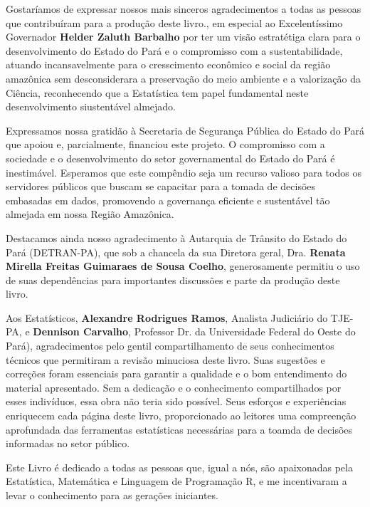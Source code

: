 \begin{refsection}


Gostaríamos de expressar nossos mais sinceros agradecimentos a todas as pessoas que contribuíram para a produção deste livro., em especial ao Excelentíssimo Governador \textbf{Helder Zaluth Barbalho} por ter um visão estratétiga clara para o desenvolvimento do Estado do Pará e o compromisso com a sustentabilidade, atuando incansavelmente para o cresscimento econômico e social da região amazônica sem desconsiderara a preservação do meio ambiente e a valorização da Ciência, reconhecendo que a Estatística tem papel fundamental neste desenvolvimento siustentável almejado.\vst

Expressamos nossa gratidão à Secretaria de Segurança Pública do Estado do Pará que apoiou e, parcialmente, financiou este projeto. O compromisso com a sociedade e o desenvolvimento do setor governamental do Estado do Pará é inestimável. Esperamos que este compêndio seja um recurso valioso para todos os servidores públicos que buscam se capacitar para a tomada de decisões embasadas em dados, promovendo a governança eficiente e sustentável tão almejada em nossa Região Amazônica.\vst

Destacamos ainda nosso agradecimento à Autarquia de Trânsito do Estado do Pará (DETRAN-PA), que sob a chancela da sua Diretora geral, Dra. \textbf{Renata Mirella Freitas Guimaraes de Sousa Coelho}, generosamente permitiu o uso de suas dependências para importantes discussões e parte da produção deste livro.
\vst

Aos Estatísticos, \textbf{Alexandre Rodrigues Ramos}, Analista Judiciário do TJE-PA, e \textbf{Dennison Carvalho}, Professor Dr. da Universidade Federal do Oeste do Pará), agradecimentos pelo gentil compartilhamento de seus conhecimentos técnicos que permitiram a revisão minuciosa deste livro. Suas sugestões e correções foram essenciais para garantir a qualidade e o bom entendimento do material apresentado. Sem a dedicação e o conhecimento compartilhados por esses indivíduos, essa obra não teria sido possível. Seus esforços e experiências enriquecem cada página deste livro, proporcionado ao leitores uma compreenção aprofundada das ferramentas estatísticas necessárias para a toamda de decisões informadas no setor público.

\newpage

Este Livro é dedicado a todas as pessoas que, igual a nós, são apaixonadas pela Estatística, Matemática e Linguagem de Programação R, e me incentivaram a levar o conhecimento para as gerações iniciantes.
\vst







\printbibliography[heading=subbibliography]
\end{refsection}






